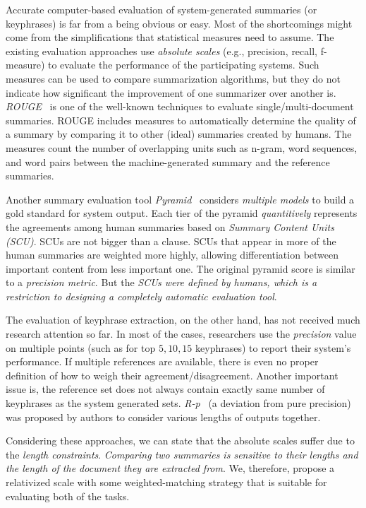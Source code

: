 \documentclass[a4paper]{report}
\begin{document}
\par  Accurate computer-based evaluation of system-generated summaries (or keyphrases) is far from a being obvious or easy. Most of the shortcomings might come from the simplifications that statistical measures need to assume. The existing evaluation approaches use \emph{absolute scales} (e.g., precision, recall, f-measure) to evaluate the performance of the participating systems. Such measures can be used to compare summarization algorithms, but they do not indicate how significant the improvement of one summarizer over another is. \emph{ROUGE}~\cite{Lin04rouge:a} is one of the well-known techniques to evaluate single/multi-document summaries. ROUGE includes measures to automatically determine the quality of a summary by comparing it to other (ideal) summaries created by humans. The measures count the number of overlapping units such as n-gram, word sequences, and word pairs between the machine-generated summary and the reference summaries.
\par Another summary evaluation tool \emph{Pyramid}~\cite{Nenkova:2007:PMI:1233912.1233913} considers \emph{multiple models} to build a gold standard for system output. Each tier of the pyramid \emph{quantitively} represents the agreements among human summaries based on \emph{Summary Content Units (SCU)}. SCUs are not bigger than a clause. SCUs that appear in more of the human summaries are weighted more highly, allowing differentiation between important content from less important one. The original pyramid score is similar to a \emph{precision metric}. But the \emph{SCUs were defined by humans, which is a restriction to designing a completely automatic evaluation tool}.
\par The evaluation of keyphrase extraction, on the other hand, has not received much research attention so far. In most of the cases, researchers use the \emph{precision} value on multiple points (such as for top $5, 10, 15$ keyphrases) to report their system's performance. If multiple references are available, there is even no proper definition of how to weigh their agreement/disagreement. Another important issue is, the reference set does not always contain exactly same number of keyphrases as the system generated sets. \emph{R-p}~\cite{DBLP:conf/ranlp/ZeschG09} (a deviation from pure precision) was proposed by authors to consider various lengths of outputs together. 
\par Considering these approaches, we can state that the absolute scales suffer due to the \emph{length constraints}. \emph{Comparing two summaries is sensitive to their lengths and the length of the document they are extracted from}. We, therefore, propose a relativized scale with some weighted-matching strategy that is suitable for evaluating both of the tasks. 
\end{document}
